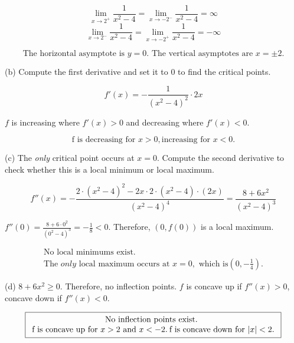 \documentclass{article}
\begin{document}
\[\lim_{x\to2^+}\frac{1}{x^2-4}=\lim_{x\to-2^-}\frac{1}{x^2-4}=\infty\]
\[\lim_{x\to2^-}\frac{1}{x^2-4}=\lim_{x\to-2^+}\frac{1}{x^2-4}=-\infty\]

\[\boxed{\text{The horizontal asymptote is } y= 0. \text{ The vertical asymptotes are } x=\pm2.}\]

\hfill

\noindent (b) Compute the first derivative and set it to $0$ to find the critical points.

\[f'(x)=-\frac{1}{\left(x^2-4\right)^2}\cdot2x\]

\noindent $f$ is increasing where $f'(x)>0$ and decreasing where $f'(x)<0$.

\[\boxed{\text{f is decreasing for } x>0, \text{increasing for } x<0.}\]

\hfill

\noindent (c) The \textit{only} critical point occurs at $x=0$. Compute the second derivative to check whether this is a local minimum or local maximum.

\begin{equation*}f''(x)=-\frac{2\cdot\left(x^2-4\right)^2-2x\cdot2\cdot(x^2-4)\cdot(2x)}{\left(x^2-4\right)^4}=\frac{8+6x^2}{\left(x^2-4\right)^3}\end{equation*}

\hfill

\noindent $\displaystyle f''(0)=\frac{8+6\cdot0^2}{\left(0^2-4\right)^3}=-\frac18<0$. Therefore, $(0, f(0))$  is a local maximum.

\[
\boxed{
\begin{array}{c}
\displaystyle \text{No local minimums exist.}\\\displaystyle \text{The }\textit{only} \text{ local maximum occurs at } x=0,\text{ which is}\left(0,-\frac14\right).
\end{array}}\]

\hfill

\noindent (d) $8+6x^2 \geq 0$. Therefore, no inflection points. $f$ is concave up if $f''(x)>0$, concave down if $f''(x)<0$.

\[
\boxed{
\begin{array}{c}
\displaystyle \text{No inflection points exist. }\\$f$ \text{ is concave up for } x>2 \text{ and } x<-2.\:$f$ \text{ is concave down for } |x|<2.
\end{array}}\]

\hfill
\end{document}
